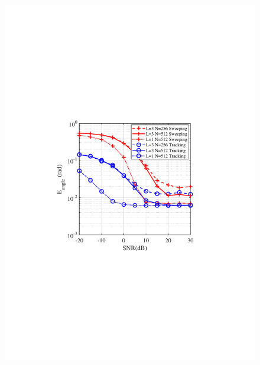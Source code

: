 \documentclass[journal,12pt,onecolumn,draftclsnofoot,]{IEEEtran}
\begin{document}
\begin{figure}
{\hspace{-6mm}\includegraphics[scale=0.46]{6-1.pdf}\hspace{-7mm}
}
\quad
\subfloat[]{
}
\end{figure}
\end{document}
